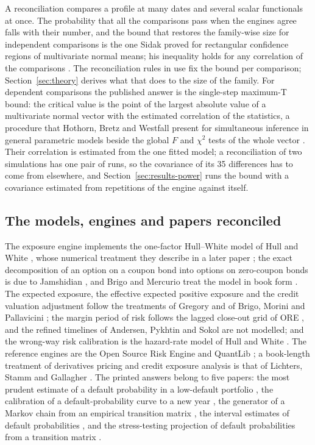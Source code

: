 A reconciliation compares a profile at many dates and several scalar functionals at once. The probability that all the comparisons pass when the engines agree falls with their number, and the bound that restores the family-wise size for independent comparisons is the one Sidak proved for rectangular confidence regions of multivariate normal means; his inequality holds for any correlation of the comparisons \citep{sidak1967}. The reconciliation rules in use fix the bound per comparison; Section~\ref{sec:theory} derives what that does to the size of the family. For dependent comparisons the published answer is the single-step maximum-T bound: the critical value is the point of the largest absolute value of a multivariate normal vector with the estimated correlation of the statistics, a procedure that Hothorn, Bretz and Westfall present for simultaneous inference in general parametric models beside the global $F$ and $\chi^{2}$ tests of the whole vector \citep{hothorn2008}. Their correlation is estimated from the one fitted model; a reconciliation of two simulations has one pair of runs, so the covariance of its 35 differences has to come from elsewhere, and Section~\ref{sec:results-power} runs the bound with a covariance estimated from repetitions of the engine against itself.

\subsection{The models, engines and papers reconciled}
\label{sec:rw-models}

The exposure engine implements the one-factor Hull--White model of Hull and White \citep{hull1990}, whose numerical treatment they describe in a later paper \citep{hull1994}; the exact decomposition of an option on a coupon bond into options on zero-coupon bonds is due to Jamshidian \citep{jamshidian1989}, and Brigo and Mercurio treat the model in book form \citep{brigo2006}. The expected exposure, the effective expected positive exposure and the credit valuation adjustment follow the treatments of Gregory \citep{gregory2020} and of Brigo, Morini and Pallavicini \citep{brigo2013}; the margin period of risk follows the lagged close-out grid of ORE \citep{ore2026}, and the refined timelines of Andersen, Pykhtin and Sokol \citep{andersen2017} are not modelled; and the wrong-way risk calibration is the hazard-rate model of Hull and White \citep{hullwhite2012}. The reference engines are the Open Source Risk Engine \citep{ore2026} and QuantLib \citep{quantlib2025}; a book-length treatment of derivatives pricing and credit exposure analysis is that of Lichters, Stamm and Gallagher \citep{lichters2015}. The printed answers belong to five papers: the most prudent estimate of a default probability in a low-default portfolio \citep{plutotasche2005}, the calibration of a default-probability curve to a new year \citep{tasche2013}, the generator of a Markov chain from an empirical transition matrix \citep{israel2001}, the interval estimates of default probabilities \citep{schuermann2004}, and the stress-testing projection of default probabilities from a transition matrix \citep{engelmann2024}.

